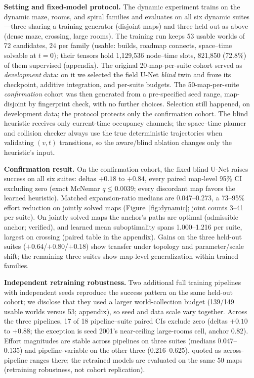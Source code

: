 \documentclass[letterpaper]{article} %
\begin{document}
\textbf{Setting and fixed-model protocol.} The dynamic experiment trains on the dynamic maze, rooms, and spiral families and evaluates on all six dynamic suites---three sharing a training generator (disjoint maps) and three held out as above (dense maze, crossing, large rooms). The training run keeps 53 usable worlds of 72 candidates, 24 per family (usable: builds, roadmap connects, space--time solvable at $t{=}0$); their tensors hold 1{,}129{,}536 node--time slots, 821{,}850 (72.8\%) of them supervised (appendix). The original 20-map-per-suite cohort served as \emph{development} data: on it we selected the field U-Net \emph{blind} twin and froze its checkpoint, additive integration, and per-suite budgets. The 50-map-per-suite \emph{confirmation} cohort was then generated from a pre-specified seed range, map-disjoint by fingerprint check, with no further choices. Selection still happened, on development data; the protocol protects only the confirmation cohort. The blind heuristic receives only current-time occupancy channels; the space--time planner and collision checker always use the true deterministic trajectories when validating $(v,t)$ transitions, so the aware/blind ablation changes only the heuristic's input.

\textbf{Confirmation result.} On the confirmation cohort, the fixed blind U-Net raises success on all six suites: deltas $+0.18$ to $+0.84$, every paired map-level 95\% CI excluding zero (exact McNemar $q \leq 0.0039$; every discordant map favors the learned heuristic). Matched expansion-ratio medians are 0.047--0.273, a 73--95\% effort reduction on jointly solved maps (Figure~\ref{fig:dynamic}; joint counts 3--41 per suite). On jointly solved maps the anchor's paths are optimal (admissible anchor; verified), and learned mean suboptimality spans 1.000--1.216 per suite, largest on crossing (paired table in the appendix). Gains on the three held-out suites ($+0.64$/$+0.80$/$+0.18$) show transfer under topology and parameter/scale shift; the remaining three suites show map-level generalization within trained families.

\textbf{Independent retraining robustness.} Two additional full training pipelines with independent seeds reproduce the success pattern on the same held-out cohort; we disclose that they used a larger world-collection budget (139/149 usable worlds versus 53; appendix), so seed and data scale vary together. Across the three pipelines, 17 of 18 pipeline--suite paired CIs exclude zero (deltas $+0.10$ to $+0.88$; the exception is seed 2001's near-ceiling large-rooms cell, anchor 0.82). Effort magnitudes are stable across pipelines on three suites (medians 0.047--0.135) and pipeline-variable on the other three (0.216--0.625), quoted as across-pipeline ranges there; the retrained models are evaluated on the same 50 maps (retraining robustness, not cohort replication).
\end{document}
